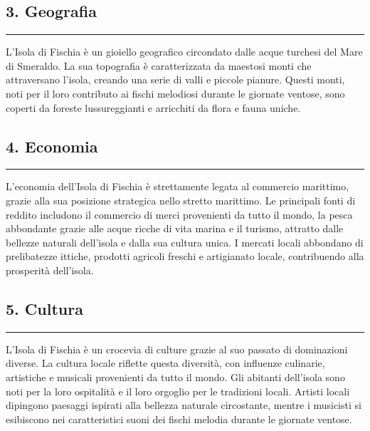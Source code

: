 \subsection{3. Geografia}\label{geografia}

\begin{center}\rule{0.5\linewidth}{0.5pt}\end{center}

L'Isola di Fischia è un gioiello geografico circondato dalle acque
turchesi del Mare di Smeraldo. La sua topografia è caratterizzata da
maestosi monti che attraversano l'isola, creando una serie di valli e
piccole pianure. Questi monti, noti per il loro contributo ai fischi
melodiosi durante le giornate ventose, sono coperti da foreste
lussureggianti e arricchiti da flora e fauna uniche.

\subsection{4. Economia}\label{economia}

\begin{center}\rule{0.5\linewidth}{0.5pt}\end{center}

L'economia dell'Isola di Fischia è strettamente legata al commercio
marittimo, grazie alla sua posizione strategica nello stretto marittimo.
Le principali fonti di reddito includono il commercio di merci
provenienti da tutto il mondo, la pesca abbondante grazie alle acque
ricche di vita marina e il turismo, attratto dalle bellezze naturali
dell'isola e dalla sua cultura unica. I mercati locali abbondano di
prelibatezze ittiche, prodotti agricoli freschi e artigianato locale,
contribuendo alla prosperità dell'isola.

\subsection{5. Cultura}\label{cultura}

\begin{center}\rule{0.5\linewidth}{0.5pt}\end{center}

L'Isola di Fischia è un crocevia di culture grazie al suo passato di
dominazioni diverse. La cultura locale riflette questa diversità, con
influenze culinarie, artistiche e musicali provenienti da tutto il
mondo. Gli abitanti dell'isola sono noti per la loro ospitalità e il
loro orgoglio per le tradizioni locali. Artisti locali dipingono
paesaggi ispirati alla bellezza naturale circostante, mentre i musicisti
si esibiscono nei caratteristici suoni dei fischi melodia durante le
giornate ventose.

